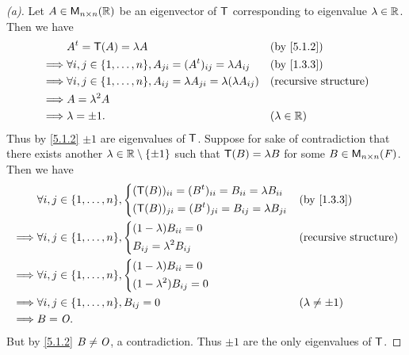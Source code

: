 \begin{proof}[(a)]
	Let \(A \in \ms[n][n][\R]\) be an eigenvector of \(\mathsf{T}\) corresponding to eigenvalue \(\lambda \in \mathbb{R}\).
	Then we have
	\begin{align*}
		         & \tp{A} = \T(A) = \lambda A                                                                &  & \by{5.1.2}                   \\
		\implies & \forall i, j \in \set{1, \dots, n}, A_{j i} = (\tp{A})_{i j} = \lambda A_{i j}            &  & \by{1.3.3}                   \\
		\implies & \forall i, j \in \set{1, \dots, n}, A_{i j} = \lambda A_{j i} = \lambda (\lambda A_{i j}) &  & \text{(recursive structure)} \\
		\implies & A = \lambda^2 A                                                                                                             \\
		\implies & \lambda = \pm 1.                                                                          &  & (\lambda \in \R)
	\end{align*}
	Thus by \cref{5.1.2} \(\pm 1\) are eigenvalues of \(\mathsf{T}\).
	Suppose for sake of contradiction that there exists another \(\lambda \in \mathbb{R} \setminus \left\lbrace\pm 1\right\rbrace\) such that \(\mathsf{T}(B) = \lambda B\) for some \(B \in \ms[n][n][\F]\).
	Then we have
	\begin{align*}
		         & \forall i, j \in \set{1, \dots, n}, \begin{dcases}
			                                               (\T(B))_{i i} = (\tp{B})_{i i} = B_{i i} = \lambda B_{i i} \\
			                                               (\T(B))_{j i} = (\tp{B})_{j i} = B_{i j} = \lambda B_{j i}
		                                               \end{dcases} &  & \by{1.3.3} \\
		\implies & \forall i, j \in \set{1, \dots, n}, \begin{dcases}
			                                               (1 - \lambda) B_{i i} = 0 \\
			                                               B_{i j} = \lambda^2 B_{i j}
		                                               \end{dcases}            &  & \text{(recursive structure)}  \\
		\implies & \forall i, j \in \set{1, \dots, n}, \begin{dcases}
			                                               (1 - \lambda) B_{i i} = 0 \\
			                                               (1 - \lambda^2) B_{i j} = 0
		                                               \end{dcases}                                 \\
		\implies & \forall i, j \in \set{1, \dots, n}, B_{i j} = 0               &  & (\lambda \neq \pm 1)        \\
		\implies & B = \zm.
	\end{align*}
	But by \cref{5.1.2} \(B \neq \mathit{O}\), a contradiction.
	Thus \(\pm 1\) are the only eigenvalues of \(\mathsf{T}\).
\end{proof}

